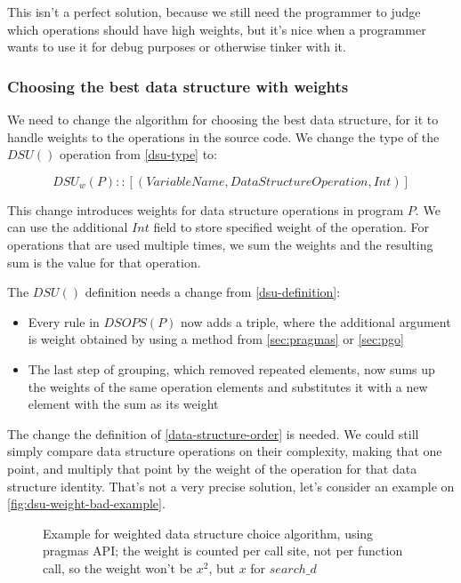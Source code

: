 \documentclass[a4paper,11pt]{article}
\begin{document}
			This isn't a perfect solution, because we still need the programmer to judge which operations
			should have high weights, but it's nice when a programmer wants to use it for debug purposes or
			otherwise tinker with it.

		\subsubsection{Choosing the best data structure with weights} \label{sec:choose-weights}

			We need to change the algorithm for choosing the best data structure, for it to handle weights
			to the operations in the source code. We change the type of the $DSU()$ operation from
			\autoref{dsu-type} to:

			\begin{equation}
				DSU_w(P) :: [(VariableName, DataStructureOperation, Int)]
			\end{equation}

			This change introduces weights for data structure operations in program $P$. We can use the
			additional $Int$ field to store specified weight of the operation.  For operations that are used
			multiple times, we sum the weights and the resulting sum is the value for that operation.

			The $DSU()$ definition needs a change from \autoref{dsu-definition}:

			\begin{itemize}
				\item Every rule in $DSOPS(P)$ now adds a triple, where the additional argument is
					weight obtained by using a method from \autoref{sec:pragmas} or
					\autoref{sec:pgo}

				\item The last step of grouping, which removed repeated elements, now sums up the weights
					of the same operation elements and substitutes it with a new element with the
					sum as its weight
			\end{itemize}

            The change the definition of \autoref{data-structure-order} is needed. We could still simply compare data
            structure operations on their complexity, making that one point, and multiply that point by the weight of
            the operation for that data structure identity. That's not a very precise solution, let's consider an
            example on \autoref{fig:dsu-weight-bad-example}.

            \begin{figure}[!h]
                

                \caption{Example for weighted data structure choice algorithm, using pragmas API; the weight is
                counted per call site, not per function call, so the weight won't be $x^2$, but $x$ for $search\_d$ }

                \label{fig:dsu-weight-bad-example}
            \end{figure}
\end{document}
